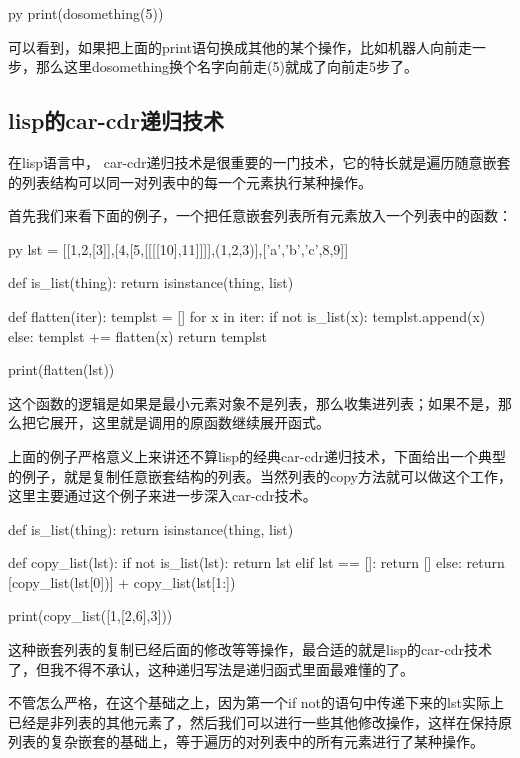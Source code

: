 \documentclass[12pt,oneside]{book}
\begin{document}
\begin{common-format}
\begin{xverbatim}[129]{py}
print(dosomething(5))
\end{xverbatim}
可以看到，如果把上面的print语句换成其他的某个操作，比如机器人向前走一步，那么这里dosomething换个名字向前走(5)就成了向前走5步了。

\subsection{lisp的car-cdr递归技术}
在lisp语言中， car-cdr递归技术是很重要的一门技术，它的特长就是遍历随意嵌套的列表结构可以同一对列表中的每一个元素执行某种操作。

首先我们来看下面的例子，一个把任意嵌套列表所有元素放入一个列表中的函数：
\begin{xverbatim}[129]{py}
lst = [[1,2,[3]],[4,[5,[[[[10],11]]]],(1,2,3)],[{'a','b','c'},8,9]]

def is_list(thing):
    return isinstance(thing, list)

def flatten(iter):
    templst = []
    for x in iter:
        if not is_list(x):
            templst.append(x)
        else:
            templst += flatten(x)
    return templst

print(flatten(lst))
\end{xverbatim}

这个函数的逻辑是如果是最小元素对象不是列表，那么收集进列表；如果不是，那么把它展开，这里就是调用的原函数继续展开函式。

上面的例子严格意义上来讲还不算lisp的经典car-cdr递归技术，下面给出一个典型的例子，就是复制任意嵌套结构的列表。当然列表的copy方法就可以做这个工作，这里主要通过这个例子来进一步深入car-cdr技术。

\begin{tcbpython}[]
def is_list(thing):
    return isinstance(thing, list)

def copy_list(lst):
    if  not  is_list(lst):
        return lst
    elif lst == []:
        return []
    else:
        return [copy_list(lst[0])] + copy_list(lst[1:])

print(copy_list([1,[2,6],3]))
\end{tcbpython}


这种嵌套列表的复制已经后面的修改等等操作，最合适的就是lisp的car-cdr技术了，但我不得不承认，这种递归写法是递归函式里面最难懂的了。

不管怎么严格，在这个基础之上，因为第一个if not的语句中传递下来的lst实际上已经是非列表的其他元素了，然后我们可以进行一些其他修改操作，这样在保持原列表的复杂嵌套的基础上，等于遍历的对列表中的所有元素进行了某种操作。


\end{common-format}
\end{document}
